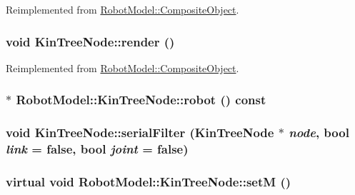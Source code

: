 Reimplemented from \hyperlink{class_robot_model_1_1_composite_object_ac63de1955b6bda820d39c01616af8665}{RobotModel::CompositeObject}.\hypertarget{class_robot_model_1_1_kin_tree_node_a85f4364980f9144471b9d92e175c539e}{
\subsubsection[{render}]{\setlength{\rightskip}{0pt plus 5cm}void KinTreeNode::render ()}}
\label{class_robot_model_1_1_kin_tree_node_a85f4364980f9144471b9d92e175c539e}


Reimplemented from \hyperlink{class_robot_model_1_1_composite_object_aee43da74b22f6272736844effe7a1dd6}{RobotModel::CompositeObject}.\hypertarget{class_robot_model_1_1_kin_tree_node_a7bd810e1df470e3d8801ac8f1aa0a60f}{
\subsubsection[{robot}]{$\ast$ RobotModel::KinTreeNode::robot () const}}
\label{class_robot_model_1_1_kin_tree_node_a7bd810e1df470e3d8801ac8f1aa0a60f}
\hypertarget{class_robot_model_1_1_kin_tree_node_adc5e295285315ab45b65c1dceeee1770}{
\subsubsection[{serialFilter}]{\setlength{\rightskip}{0pt plus 5cm}void KinTreeNode::serialFilter ({\bf KinTreeNode} $\ast$ {\em node}, \/  bool {\em link} = {\ttfamily false}, \/  bool {\em joint} = {\ttfamily false})}}
\label{class_robot_model_1_1_kin_tree_node_adc5e295285315ab45b65c1dceeee1770}
\hypertarget{class_robot_model_1_1_kin_tree_node_a47574c65af53990455540547d8d00e9f}{
\subsubsection[{setM}]{\setlength{\rightskip}{0pt plus 5cm}virtual void RobotModel::KinTreeNode::setM ()}}
\label{class_robot_model_1_1_kin_tree_node_a47574c65af53990455540547d8d00e9f}



